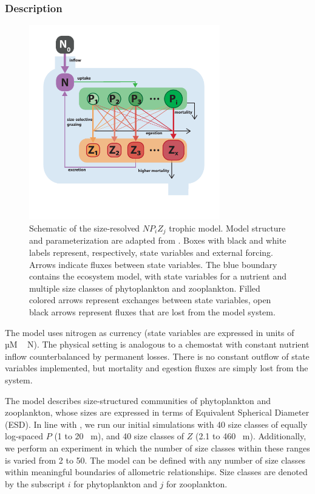\documentclass[journal abbreviation, manuscript]{copernicus}
\begin{document}
\subsubsection{Description}
\begin{figure}[t]
\includegraphics[width=8.3cm]{Figures/firstdraft_schematics/03_schematics_ASTroCAT.pdf}
\caption{Schematic of the size-resolved $NP_{i}Z_{j}$ trophic model. Model structure and parameterization are adapted from \citet{Banas2011b}. 
Boxes with black and white labels represent, respectively, state variables and external forcing. Arrows indicate fluxes between state variables. The blue boundary contains the ecosystem model, with state variables for a nutrient and multiple size classes of phytoplankton and zooplankton. Filled colored arrows represent exchanges between state variables, open black arrows represent fluxes that are lost from the model system.}
\label{Figure:ModelSchematics_3}
\end{figure}

The model uses nitrogen as currency (state variables are expressed in units of \unit{µM\,N}). The physical setting is analogous to a chemostat with constant nutrient inflow counterbalanced by permanent losses. There is no constant outflow of state variables implemented, but mortality and egestion fluxes are simply lost from the system. 

The model describes size-structured communities of phytoplankton and zooplankton, whose sizes are expressed in terms of Equivalent Spherical Diameter (ESD). In line with \citet{Banas2011b}, we run our initial simulations with 40 size classes of equally log-spaced $P$ (1 to 20 \unit{\mu m}), and 40 size classes of $Z$ (2.1 to 460  \unit{\mu m}). Additionally, we perform an experiment in which the number of size classes within these ranges is varied from 2 to 50. The model can be defined with any number of size classes within meaningful boundaries of allometric relationships. Size classes are denoted by the subscript $i$ for phytoplankton and $j$ for zooplankton.
\end{document}
